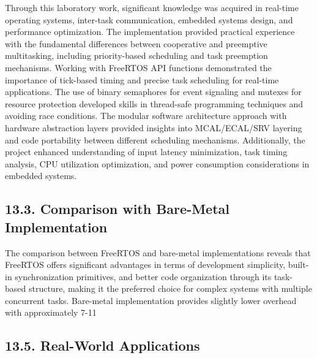 \documentclass[12pt]{article}
\begin{document}
Through this laboratory work, significant knowledge was acquired in real-time operating systems, inter-task communication, embedded systems design, and performance optimization. The implementation provided practical experience with the fundamental differences between cooperative and preemptive multitasking, including priority-based scheduling and task preemption mechanisms. Working with FreeRTOS API functions demonstrated the importance of tick-based timing and precise task scheduling for real-time applications. The use of binary semaphores for event signaling and mutexes for resource protection developed skills in thread-safe programming techniques and avoiding race conditions. The modular software architecture approach with hardware abstraction layers provided insights into MCAL/ECAL/SRV layering and code portability between different scheduling mechanisms. Additionally, the project enhanced understanding of input latency minimization, task timing analysis, CPU utilization optimization, and power consumption considerations in embedded systems.

\subsection*{13.3. Comparison with Bare-Metal Implementation}

The comparison between FreeRTOS and bare-metal implementations reveals that FreeRTOS offers significant advantages in terms of development simplicity, built-in synchronization primitives, and better code organization through its task-based structure, making it the preferred choice for complex systems with multiple concurrent tasks. Bare-metal implementation provides slightly lower overhead with approximately 7-11%

\subsection*{13.5. Real-World Applications}
\end{document}
